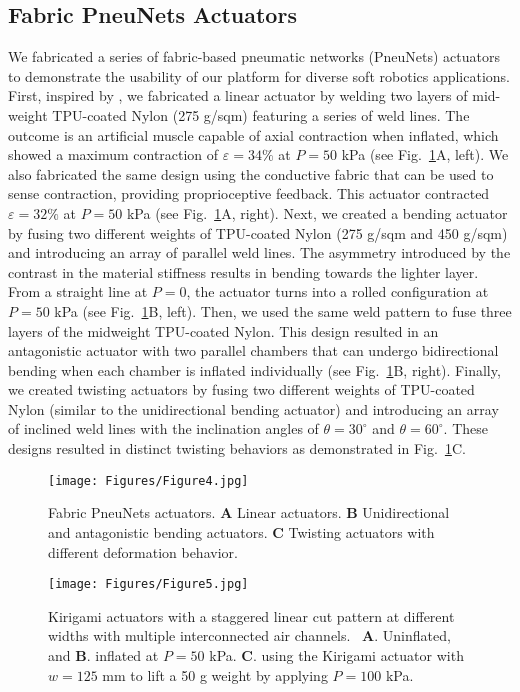 \documentclass[journal, letterpaper]{IEEEtran}
\begin{document}
\subsection{Fabric PneuNets Actuators}
We fabricated a series of fabric-based pneumatic networks (PneuNets) actuators to demonstrate the usability of our platform for diverse soft robotics applications.
First, inspired by \cite{nguyen2020design}, we fabricated a linear actuator by welding two layers of mid-weight TPU-coated Nylon (275 g/sqm) featuring a series of weld lines. The outcome is an artificial muscle capable of axial contraction when inflated, which showed a maximum contraction of $\varepsilon=34\%$ at $P=50$ kPa (see Fig.~\ref{Fig4}A, left). We also fabricated the same design using the conductive fabric that can be used to sense contraction, providing proprioceptive feedback. This actuator contracted $\varepsilon=32\%$ at $P=50$ kPa (see Fig.~\ref{Fig4}A, right).
Next, we created a bending actuator by fusing two different weights of TPU-coated Nylon (275 g/sqm and 450 g/sqm) and introducing an array of parallel weld lines. The asymmetry introduced by the contrast in the material stiffness results in bending towards the lighter layer. From a straight line at $P=0$, the actuator turns into a rolled configuration at $P=50$ kPa (see Fig.~\ref{Fig4}B, left). Then, we used the same weld pattern to fuse three layers of the midweight TPU-coated Nylon. This design resulted in an antagonistic actuator with two parallel chambers that can undergo bidirectional bending when each chamber is inflated individually (see Fig.~\ref{Fig4}B, right). 
Finally, we created twisting actuators by fusing two different weights of TPU-coated Nylon (similar to the unidirectional bending actuator) and introducing an array of inclined weld lines with the inclination angles of $\theta=30^\circ$ and $\theta=60^\circ$.
These designs resulted in distinct twisting behaviors as demonstrated in Fig.~\ref{Fig4}C. 

\begin{figure}[t]
\centering
\texttt{[image: Figures/Figure4.jpg]}
\caption{Fabric PneuNets actuators. \textbf{A} Linear actuators. \textbf{B} Unidirectional and antagonistic bending actuators. \textbf{C} Twisting actuators with different deformation behavior.}
\label{Fig4}
\end{figure}



\begin{figure}[t]
\centering
\texttt{[image: Figures/Figure5.jpg]}
\caption{Kirigami actuators with a staggered linear cut pattern at different widths with multiple interconnected air channels. ~\textbf{A}. Uninflated, and \textbf{B}. inflated at $P=50$ kPa.
\textbf{C}. using the Kirigami actuator with $w=125$ mm to lift a 50 g weight by applying $P=100$ kPa. }
\label{Fig5}
\end{figure}
\end{document}
